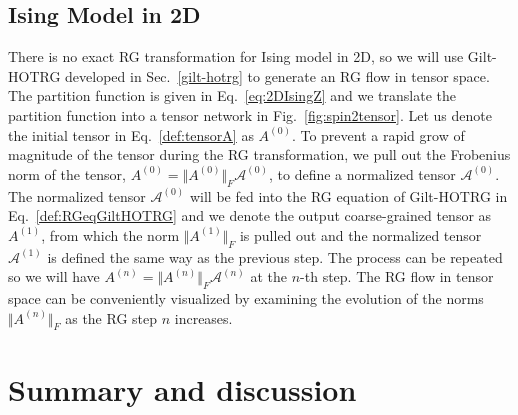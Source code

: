 \documentclass[aps,prb,reprint,superscriptaddress]{revtex4-2}
\begin{document}
\subsection{Ising Model in 2D\label{benchmark:2DIsing}}
There is no exact RG transformation for Ising model in 2D, so we will
use Gilt-HOTRG developed in Sec.~\ref{gilt-hotrg} to generate an RG flow
in tensor space. The partition function is given in
Eq.~\eqref{eq:2DIsingZ} and we translate the partition function into
a tensor network in Fig.~\ref{fig:spin2tensor}. Let us denote the
initial tensor in Eq.~\eqref{def:tensorA} as $A^{(0)}$. To prevent a
rapid grow of magnitude of the tensor during the RG transformation, we
pull out the Frobenius norm of the tensor, $A^{(0)} = \Vert
A^{(0)}\Vert_F \mathcal{A}^{(0)}$, to define a normalized tensor
$\mathcal{A}^{(0)}$. The normalized tensor $\mathcal{A}^{(0)}$ will be
fed into the RG equation of Gilt-HOTRG in Eq.~\eqref{def:RGeqGiltHOTRG}
and we denote the output coarse-grained tensor as $A^{(1)}$, from which
the norm $\Vert A^{(1)}\Vert_F$ is pulled out and the normalized tensor
$\mathcal{A}^{(1)}$ is defined the same way as the previous step. The
process can be repeated so we will have $A^{(n)} = \Vert A^{(n)}\Vert_F
\mathcal{A}^{(n)}$ at the $n$-th step. The RG flow in tensor space can
be conveniently visualized by examining the evolution of the norms
$\Vert A^{(n)}\Vert_F$ as the RG step $n$ increases.





\section{Summary and discussion}


%
\end{document}
